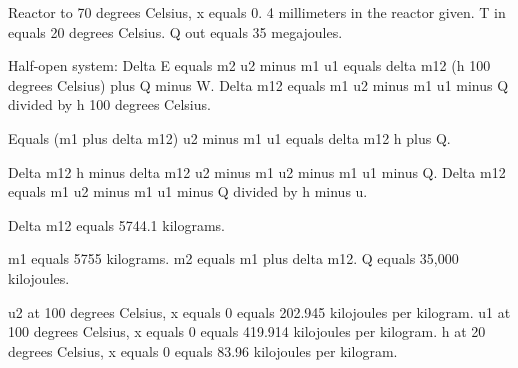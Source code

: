 Reactor to 70 degrees Celsius, x equals 0.  
4 millimeters in the reactor given.  
T in equals 20 degrees Celsius.  
Q out equals 35 megajoules.  

Half-open system:  
Delta E equals m2 u2 minus m1 u1 equals delta m12 (h 100 degrees Celsius) plus Q minus W.  
Delta m12 equals m1 u2 minus m1 u1 minus Q divided by h 100 degrees Celsius.  

Equals (m1 plus delta m12) u2 minus m1 u1 equals delta m12 h plus Q.  

Delta m12 h minus delta m12 u2 minus m1 u2 minus m1 u1 minus Q.  
Delta m12 equals m1 u2 minus m1 u1 minus Q divided by h minus u.  

Delta m12 equals 5744.1 kilograms.  

m1 equals 5755 kilograms.  
m2 equals m1 plus delta m12.  
Q equals 35,000 kilojoules.  

u2 at 100 degrees Celsius, x equals 0 equals 202.945 kilojoules per kilogram.  
u1 at 100 degrees Celsius, x equals 0 equals 419.914 kilojoules per kilogram.  
h at 20 degrees Celsius, x equals 0 equals 83.96 kilojoules per kilogram.